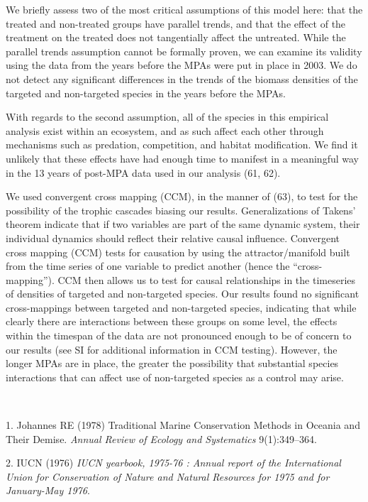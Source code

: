 \documentclass[9pt,twocolumn,twoside,lineno]{pnas-new}
\begin{document}
We briefly assess two of the most critical assumptions of this model
here: that the treated and non-treated groups have parallel trends, and
that the effect of the treatment on the treated does not tangentially
affect the untreated. While the parallel trends assumption cannot be
formally proven, we can examine its validity using the data from the
years before the MPAs were put in place in 2003. We do not detect any
significant differences in the trends of the biomass densities of the
targeted and non-targeted species in the years before the MPAs.

With regards to the second assumption, all of the species in this
empirical analysis exist within an ecosystem, and as such affect each
other through mechanisms such as predation, competition, and habitat
modification. We find it unlikely that these effects have had enough
time to manifest in a meaningful way in the 13 years of post-MPA data
used in our analysis (61, 62).

We used convergent cross mapping (CCM), in the manner of (63), to test
for the possibility of the trophic cascades biasing our results.
Generalizations of Takens' theorem indicate that if two variables are
part of the same dynamic system, their individual dynamics should
reflect their relative causal influence. Convergent cross mapping (CCM)
tests for causation by using the attractor/manifold built from the time
series of one variable to predict another (hence the ``cross-mapping'').
CCM then allows us to test for causal relationships in the timeseries of
densities of targeted and non-targeted species. Our results found no
significant cross-mappings between targeted and non-targeted species,
indicating that while clearly there are interactions between these
groups on some level, the effects within the timespan of the data are
not pronounced enough to be of concern to our results (see SI for
additional information in CCM testing). However, the longer MPAs are in
place, the greater the possibility that substantial species interactions
that can affect use of non-targeted species as a control may arise.

\showacknow

~ ~ ~

\hypertarget{refs}{}
\leavevmode\hypertarget{ref-johannes1978}{}%
1. Johannes RE (1978) Traditional Marine Conservation Methods in Oceania
and Their Demise. \emph{Annual Review of Ecology and Systematics}
9(1):349--364.

\leavevmode\hypertarget{ref-iucn1976}{}%
2. IUCN (1976) \emph{IUCN yearbook, 1975-76 : Annual report of the
International Union for Conservation of Nature and Natural Resources for
1975 and for January-May 1976}.
\end{document}
